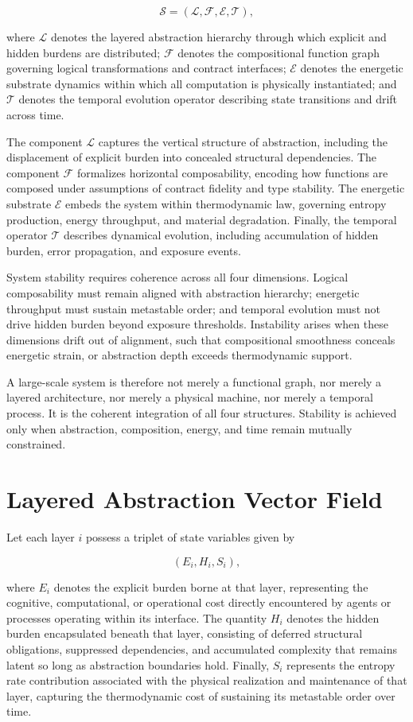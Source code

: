 \documentclass[11pt,openany]{book}
\begin{document}
\[
\mathcal{S} = (\mathcal{L}, \mathcal{F}, \mathcal{E}, \mathcal{T}),
\]

where $\mathcal{L}$ denotes the layered abstraction hierarchy through which 
explicit and hidden burdens are distributed; $\mathcal{F}$ denotes the 
compositional function graph governing logical transformations and contract 
interfaces; $\mathcal{E}$ denotes the energetic substrate dynamics within 
which all computation is physically instantiated; and $\mathcal{T}$ denotes 
the temporal evolution operator describing state transitions and drift across 
time.

The component $\mathcal{L}$ captures the vertical structure of abstraction, 
including the displacement of explicit burden into concealed structural 
dependencies. The component $\mathcal{F}$ formalizes horizontal composability, 
encoding how functions are composed under assumptions of contract fidelity 
and type stability. The energetic substrate $\mathcal{E}$ embeds the system 
within thermodynamic law, governing entropy production, energy throughput, 
and material degradation. Finally, the temporal operator $\mathcal{T}$ 
describes dynamical evolution, including accumulation of hidden burden, 
error propagation, and exposure events.

System stability requires coherence across all four dimensions. Logical 
composability must remain aligned with abstraction hierarchy; energetic 
throughput must sustain metastable order; and temporal evolution must not 
drive hidden burden beyond exposure thresholds. Instability arises when 
these dimensions drift out of alignment, such that compositional smoothness 
conceals energetic strain, or abstraction depth exceeds thermodynamic support.

A large-scale system is therefore not merely a functional graph, nor merely 
a layered architecture, nor merely a physical machine, nor merely a temporal 
process. It is the coherent integration of all four structures. Stability 
is achieved only when abstraction, composition, energy, and time remain 
mutually constrained.

\section{Layered Abstraction Vector Field}

Let each layer $i$ possess a triplet of state variables given by

\[
(E_i, H_i, S_i),
\]

where $E_i$ denotes the explicit burden borne at that layer, representing the 
cognitive, computational, or operational cost directly encountered by agents 
or processes operating within its interface. The quantity $H_i$ denotes the 
hidden burden encapsulated beneath that layer, consisting of deferred structural 
obligations, suppressed dependencies, and accumulated complexity that remains 
latent so long as abstraction boundaries hold. Finally, $S_i$ represents the 
entropy rate contribution associated with the physical realization and maintenance 
of that layer, capturing the thermodynamic cost of sustaining its metastable order 
over time. 
\end{document}

